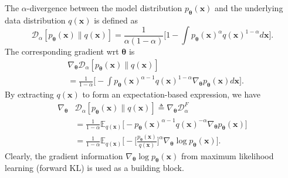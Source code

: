 \documentclass[letterpaper]{article} %
\newcommand{\Dc}[0]{\ensuremath{\mathcal{D}} }
\newcommand{\Ebb}[0]{\ensuremath{\mathbb{E}} }
\newcommand{\xv}[0]{\ensuremath{\boldsymbol{x}} }
\newcommand{\thetav}[0]{\ensuremath{\boldsymbol{\theta}} }
\begin{document}
The $\alpha$-divergence between the model distribution $p_{\thetav}(\xv)$ and the underlying data distribution $q(\xv)$ is defined as  
\begin{equation}
    \Dc_{\alpha} [p_{\thetav}(\xv) \| q(\xv)]
    = \frac{1}{\alpha (1 - \alpha)} \Big[
    1 - \int p_{\thetav}(\xv)^{\alpha} q(\xv)^{1-\alpha} d\xv \Big].
\end{equation}
The corresponding gradient wrt $\thetav$ is
\begin{equation}
\begin{aligned}
    & \nabla_{\thetav} \Dc_{\alpha} [p_{\thetav}(\xv) \| q(\xv)]
    \\
    & 
    = \frac{1}{1 - \alpha} \Big[
    - \int p_{\thetav}(\xv)^{\alpha - 1} q(\xv)^{1-\alpha} \nabla_{\thetav} p_{\thetav}(\xv) d\xv \Big].
\end{aligned}
\end{equation}
By extracting $q(\xv)$ to form an expectation-based expression, we have
\begin{equation}
\begin{aligned}
    \nabla_{\thetav} & \Dc_{\alpha} [p_{\thetav}(\xv) \| q(\xv)]
    \triangleq \nabla_{\thetav} \Dc_{\alpha}^F
    \\
    & = \frac{1}{1 - \alpha} \Ebb_{q(\xv)} \Big[
    - p_{\thetav}(\xv)^{\alpha - 1} q(\xv)^{-\alpha} \nabla_{\thetav} p_{\thetav}(\xv) \Big]
    \\
    & 
    = \frac{1}{1-\alpha} \Ebb_{q(\xv)} \bigg[
    -\Big[ \frac{p_{\thetav}(\xv)}{q(\xv)} \Big]^{\alpha}
    \nabla_{\thetav} \log p_{\thetav}(\xv)
    \bigg].
\end{aligned}
\end{equation}
Clearly, the gradient information $\nabla_{\thetav} \log p_{\thetav}(\xv)$ from maximum likelihood learning (forward KL) is used as a building block.
\end{document}
